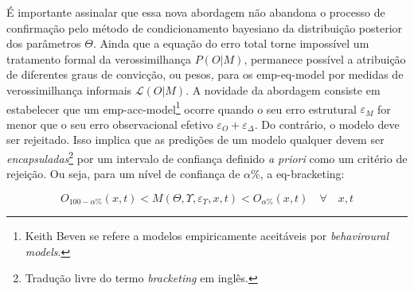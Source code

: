 \documentclass[./main.tex]{subfiles}
\begin{document}
\noindent É importante assinalar que essa nova abordagem não abandona o processo de confirmação pelo método de condicionamento bayesiano da distribuição posterior dos parâmetros $\Theta$. Ainda que a equação do erro total torne impossível um tratamento formal da verossimilhança $P(O|M)$, permanece possível a atribuição de diferentes graus de convicção, ou pesos, para os \gls{emp-eq-model} por medidas de verossimilhança informais $\mathcal{L}(O|M)$. A novidade da abordagem consiste em estabelecer que um \gls{emp-acc-model}\footnote{Keith Beven se refere a modelos empiricamente aceitáveis por \textit{behaviroural models}.} ocorre quando o seu erro estrutural $\varepsilon_M$ for menor que o seu erro observacional efetivo $\varepsilon_O + \varepsilon_{\Delta}$. Do contrário, o modelo deve ser rejeitado. Isso implica que as predições de um modelo qualquer devem ser \textit{encapsuladas}\footnote{Tradução livre do termo \textit{ bracketing} em inglês.} por um intervalo de confiança definido \textit{a priori} como um critério de rejeição. Ou seja, para um nível de confiança de $\alpha$\%, a \gls{eq-bracketing}:
\begin{linenomath*}
\begin{equation}
\label{eq:bracketing}
    O_{100-\alpha\%}(x, t) < M(\Theta, \Upsilon, \varepsilon_{\Upsilon}, x, t) < O_{\alpha\%}(x, t) \quad \forall \quad x, t
\end{equation}
\end{linenomath*}
\end{document}
